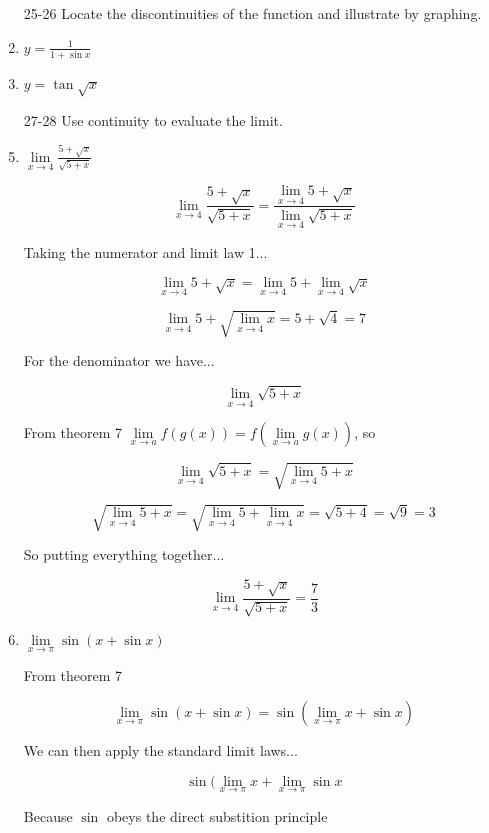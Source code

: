 \documentclass{article}
\begin{document}
\begin{enumerate}
			\item[25-26] Locate the discontinuities of the function and illustrate by
			graphing.

			\item $y = \frac{1}{1 + \sin x}$

			\item $y = \tan \sqrt{x}$

			\item[27-28] Use continuity to evaluate the limit.			

			\item $\lim \limits _{x \to 4} \frac{5 + \sqrt{x}}{\sqrt{5 + x}}$

			$$\lim \limits _{x \to 4} \frac{5 + \sqrt{x}}{\sqrt{5 + x}} = 
				\frac{\lim \limits _{x \to 4} 5 + \sqrt{x}}{\lim \limits _{x \to 4} \sqrt{5 + x}}$$

			Taking the numerator and limit law 1...

			$$\lim \limits _{x \to 4} 5 + \sqrt{x} = \lim \limits _{x \to 4} 5 + \lim \limits _{x \to 4} \sqrt{x}$$

			$$\lim \limits _{x \to 4} 5 +\sqrt{\lim \limits _{x \to 4} x} = 5 + \sqrt{4} = 7$$

			For the denominator we have...

			$$\lim \limits _{x \to 4} \sqrt{5 + x}$$

			From theorem 7 $\lim \limits _{x \to a} f(g(x)) = f(\lim \limits _{x \to a} g(x))$, so

			$$\lim \limits _{x \to 4} \sqrt{5 + x} = \sqrt{\lim \limits _{x \to 4} 5 + x}$$

			$$\sqrt{\lim \limits _{x \to 4} 5 + x } = \sqrt{\lim \limits _{x \to 4} 5 + \lim \limits _{x \to 4} x}
				= \sqrt{5 + 4} = \sqrt{9}  = 3$$

			So putting everything together...

			$$\lim \limits _{x \to 4} \frac{5 + \sqrt{x}}{\sqrt{5 + x}} = \frac{7}{3}$$

			\item $\lim \limits _{x \to \pi} \sin (x + \sin x)$

			From theorem 7 

			$$\lim \limits _{x \to \pi} \sin (x + \sin x) = \sin (\lim \limits _{x \to \pi} x + \sin x)$$

			We can then apply the standard limit laws...

			$$\sin (\lim \limits _{x \to \pi} x + \lim \limits _{x \to \pi} \sin x$$

			Because $\sin$ obeys the direct substition principle 


\end{enumerate}
\end{document}
